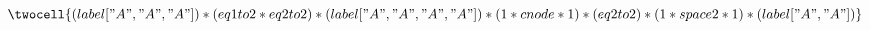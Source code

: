 \documentclass{standalone}
\begin{document}
$ \twocell{
  (label["A","A","A"])
  *
  (eq1to2 * eq2to2)
  *
  (label["A","A","A","A"])
  *
  (1 * cnode * 1)
  *
  (eq2to2)
  *
  (1 * space2 * 1)
  *
  (label["A","A"])
} $
\end{document}
